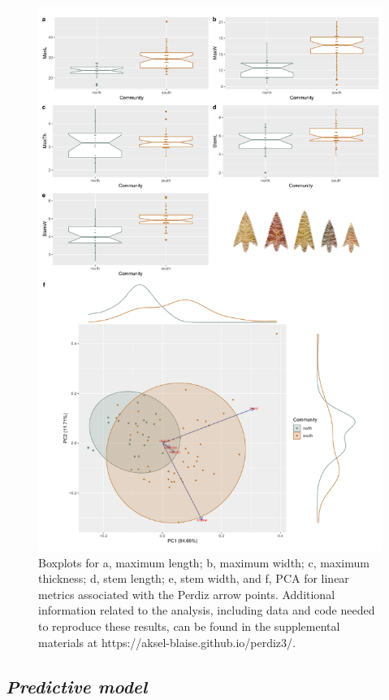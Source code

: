 \documentclass[smallextended]{svjour3}       %
\begin{document}
\begin{figure}
\includegraphics[width=0.95\linewidth]{ms-figs/figure2} \caption{Boxplots for a, maximum length; b, maximum width; c, maximum thickness; d, stem length; e, stem width, and f, PCA for linear metrics associated with the Perdiz arrow points. Additional information related to the analysis, including data and code needed to reproduce these results, can be found in the supplemental materials at https://aksel-blaise.github.io/perdiz3/.}\label{fig:fig2}
\end{figure}

\hypertarget{predictive-model}{%
\subsection{\texorpdfstring{\emph{Predictive
model}}{Predictive model}}\label{predictive-model}}
\end{document}
